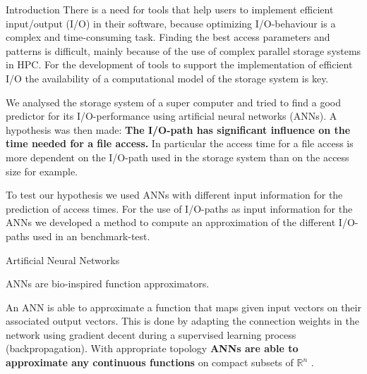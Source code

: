 \documentclass[final]{beamer}
\newlength{\onecolwid}
\begin{document}
\begin{frame}[t]
\begin{columns}[t]
\begin{column}{\onecolwid}
\begin{block}{Introduction}
There is a need for tools that help users to implement efficient input/output (I/O) in their software, because optimizing I/O-behaviour is a complex and time-consuming task.
Finding the best access parameters and patterns is difficult, mainly because of the use of complex parallel storage systems in HPC.
For the development of tools to support the implementation of efficient I/O the availability of a computational model of the storage system is key.\medskip

We analysed the storage system of a super computer and tried to find a good predictor for its I/O-performance using artificial neural networks (ANNs).
A hypothesis was then made: \textbf{The I/O-path has significant influence on the time needed for a file access.}
In particular the access time for a file access is more dependent on the I/O-path used in the storage system than on the access size for example.\medskip

To test our hypothesis we used ANNs with different input information for the prediction of access times.
For the use of I/O-paths as input information for the ANNs we developed a method to compute an approximation of the different I/O-paths used in an benchmark-test.

\end{block}




\begin{block}{Artificial Neural Networks}
	
	ANNs are bio-inspired function approximators.
	
	
	An ANN is able to approximate a function that maps given input vectors on their associated output vectors.
	This is done by adapting the connection weights in the network using gradient decent during a supervised learning process (backpropagation).
	With appropriate topology \textbf{ANNs are able to approximate any continuous functions} on compact subsets of $\mathbb{R}^n$ \cite{cybenko:mcss}.
	

\end{block}
\end{column}
\end{columns}
\end{frame}
\end{document}
